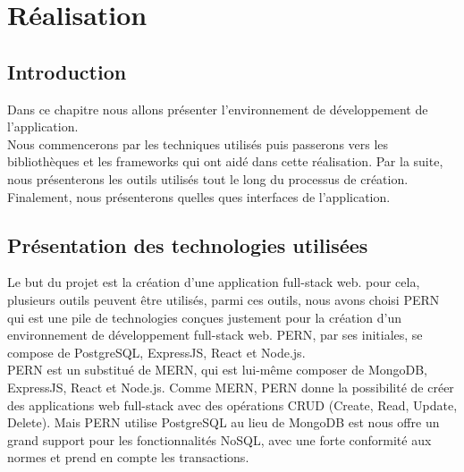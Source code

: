 \chapter{Réalisation}

\section{Introduction}
    Dans ce chapitre nous allons présenter l'environnement de développement de l'application.\\

    Nous commencerons par les techniques utilisés puis passerons vers les bibliothèques et les frameworks qui ont aidé dans cette réalisation. Par la suite, nous présenterons les outils utilisés tout le long du processus de création.\\

    Finalement, nous présenterons quelles ques interfaces de l'application.\\

\section{Présentation des technologies utilisées}
    Le but du projet est la création d'une application full-stack web. pour cela, plusieurs outils peuvent être utilisés, parmi ces outils, nous avons choisi \acs{PERN} qui est une pile de technologies conçues justement pour la création d'un environnement de développement full-stack web. \acs{PERN}, par ses initiales, se compose de PostgreSQL, ExpressJS, React et Node.js.\\

    \acs{PERN} est un substitué de \acs{MERN}, qui est lui-même composer de MongoDB, ExpressJS, React et Node.js. Comme \acs{MERN}, \acs{PERN} donne la possibilité de créer des applications web full-stack avec des opérations \acs{CRUD} (Create, Read, Update, Delete). Mais \acs{PERN} utilise PostgreSQL au lieu de MongoDB est nous offre un grand support pour les fonctionnalités \acs{NoSQL}, avec une forte conformité aux normes et prend en compte les transactions.\\

